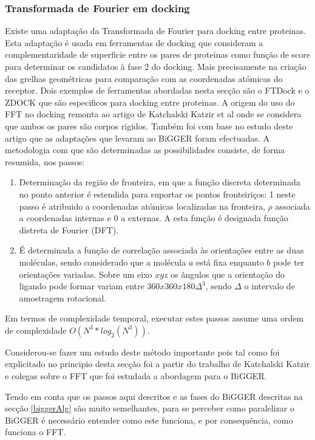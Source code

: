 \subsubsection{Transformada de Fourier em docking}
\label{fft}
Existe uma adaptação da Transformada de Fourier para docking entre proteinas. Esta adaptação é usada em ferramentas de docking que consideram a complementaridade de superficie entre os pares de proteinas como função de score para determinar os candidatos à fase 2 do docking. Mais precisamente na criação das grelhas geométricas para comparação com as coordenadas atómicas do receptor. Dois exemplos de ferramentas abordadas nesta secção são o FTDock e o ZDOCK que são especificos para docking entre proteinas.
A origem do uso do FFT no docking remonta ao artigo de Katchalski Katzir et al \cite{katchalski1992} onde se considera que ambos os pares são corpos rigidos. Também foi com base no estudo deste artigo que as adaptações que levaram ao BiGGER foram efectuadas\cite{biggerPaper}.
 A metodologia com que são determinadas as possibilidades consiste, de forma resumida, nos passos:
\begin{enumerate}
	\item Determinação da região de fronteira, em que a função discreta determinada no ponto anterior é estendida para suportar os pontos fronteiriços: 1 neste passo é atribuido a coordenadas atómicas localizadas na fronteira, $\rho$ associada a coordenadas internas e 0 a externas. A esta função é designada função distreta de Fourier (DFT).
	
	\item É determinada a função de correlação associada às orientações entre as duas moléculas, sendo considerado que a molécula $a$ está fixa enquanto $b$ pode ter orientações variadas. Sobre um eixo $xyz$ os ângulos que a orientação do ligando pode formar variam entre $360x360x180\Delta^{3}$, sendo $\Delta$ o intervalo de amostragem rotacional.

\end{enumerate} 
Em termos de complexidade temporal, executar estes passos assume uma ordem de complexidade $O(N^{3}*log_2(N^{3}))$\cite{teseProf}.

Considerou-se fazer um estudo deste método importante pois tal como foi explicitado no principio desta secção foi a partir do trabalho de Katchalski Katzir e colegas sobre o FFT que foi estudada a abordagem para o BiGGER\cite{teseProf}. 

Tendo em conta que os passos aqui descritos e as fases do BiGGER descritas na secção \ref{biggerAlg} são muito semelhantes, para se perceber como paralelizar o BiGGER é necessário entender como este funciona, e por consequência, como funciona o FFT. 

